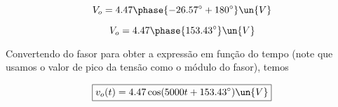 \[ V_o = 4.47\phase{-26.57^{\circ} + 180^{\circ}} \un{V} \]

\[ V_o = 4.47\phase{153.43^{\circ}} \un{V} \]

Convertendo do fasor para obter a expressão em função do tempo (note que usamos o valor de pico da tensão como o módulo do fasor),
temos

\[ \boxed{v_o(t) = 4.47\cos(5000t + 153.43^{\circ}) \un{V}}  \]











    























